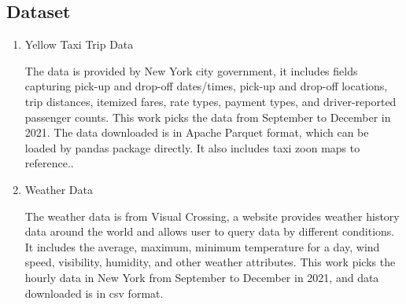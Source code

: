 \documentclass[11pt]{article}
\begin{document}
\subsection{Dataset}
\begin{enumerate} 
    \item Yellow Taxi Trip Data
    
The data is provided by New York city government, it includes fields capturing pick-up and drop-off dates/times, pick-up and drop-off locations, trip distances, itemized fares, rate types, payment types, and driver-reported passenger counts. This work picks the data from September to December in 2021. The data downloaded is in Apache Parquet format, which can be loaded by pandas package directly. It also includes taxi zoon maps to reference.\cite{ref2}.

    \item Weather Data
    
The weather data is from Visual Crossing, a website provides weather history data around the world and allows user to query data by different conditions. It includes the average, maximum, minimum temperature for a day, wind speed, visibility, humidity, and other weather attributes. This work picks the hourly data in New York from September to December in 2021, and data downloaded is in csv format.

\end{enumerate}
\end{document}
